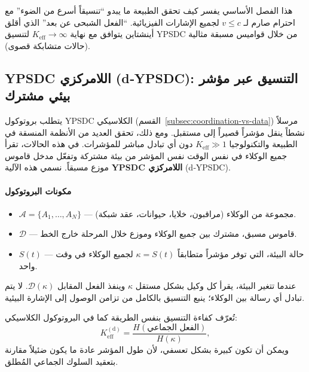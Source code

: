 \documentclass[11pt,a4paper]{article}
\begin{document}
	هذا الفصل الأساسي يفسر كيف تحقق الطبيعة ما يبدو ``تنسيقاً أسرع من الضوء'' مع احترام صارم لـ $v \leq c$ لجميع الإشارات الفيزيائية. ``الفعل الشبحى عن بعد'' الذي أقلق أينشتاين يتوافق مع نهاية $K_{\mathrm{eff}} \to \infty$ لتنسيق YPSDC من خلال قواميس مسبقة مثالية (حالات متشابكة قصوى).
	
	\subsection{YPSDC اللامركزي (d‑YPSDC): التنسيق عبر مؤشر بيئي مشترك}
	\label{subsec:d-ypsdc}
	
	يتطلب بروتوكول YPSDC الكلاسيكي (القسم~\ref{subsec:coordination-vs-data}) مرسلاً نشطاً ينقل مؤشراً قصيراً إلى مستقبل. ومع ذلك، تحقق العديد من الأنظمة المنسقة في الطبيعة والتكنولوجيا $K_{\mathrm{eff}} \gg 1$ دون أي تبادل مباشر للمؤشرات. في هذه الحالات، تقرأ جميع الوكلاء في نفس الوقت نفس المؤشر من بيئة مشتركة وتفعّل مدخل قاموس موزع مسبقاً. نسمي هذه الآلية \textbf{YPSDC اللامركزي} (d‑YPSDC).
	
	\paragraph*{مكونات البروتوكول}
	\begin{itemize}[leftmargin=*]
		\item $\mathcal{A} = \{A_1,\dots,A_N\}$ — مجموعة من الوكلاء (مراقبون، خلايا، حيوانات، عقد شبكة).
		\item $\mathcal{D}$ — قاموس مسبق، مشترك بين جميع الوكلاء وموزع خلال المرحلة خارج الخط.
		\item $S(t)$ — حالة البيئة، التي توفر مؤشراً متطابقاً $\kappa = S(t)$ لجميع الوكلاء في وقت واحد.
	\end{itemize}
	عندما تتغير البيئة، يقرأ كل وكيل بشكل مستقل $\kappa$ وينفذ الفعل المقابل $\mathcal{D}(\kappa)$. لا يتم تبادل أي رسالة بين الوكلاء؛ ينبع التنسيق بالكامل من تزامن الوصول إلى الإشارة البيئية.
	
	تُعرّف كفاءة التنسيق بنفس الطريقة كما في البروتوكول الكلاسيكي:
	\[
	K_{\mathrm{eff}}^{\mathrm{(d)}} = \frac{H(\text{الفعل الجماعي})}{H(\kappa)},
	\]
	ويمكن أن تكون كبيرة بشكل تعسفي، لأن طول المؤشر عادة ما يكون ضئيلاً مقارنة بتعقيد السلوك الجماعي المُطلق.
	
\end{document}
